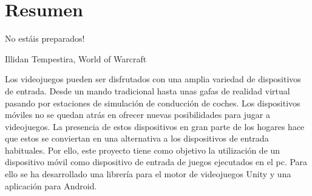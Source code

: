 %
%
%
%
%
%
%
%
%
%
%
%
%


\chapter{Resumen}

\begin{FraseCelebre}
\begin{Frase}
\textexclamdown No est\'ais preparados!
\end{Frase}
\begin{Fuente}
 Illidan Tempestira, World of Warcraft
\end{Fuente}
\end{FraseCelebre}

Los videojuegos pueden ser disfrutados con una amplia variedad de dispositivos de entrada. Desde un mando tradicional hasta unas gafas de realidad virtual pasando por estaciones de simulaci\'on de conducci\'on de coches. Los dispositivos m\'oviles no se quedan atr\'as en ofrecer nuevas posibilidades para jugar a videojuegos. La presencia de estos dispositivos en gran parte de los hogares hace que estos se conviertan en una alternativa a los dispositivos de entrada habituales. Por ello, este proyecto tiene como objetivo la utilizaci\'on de un dispositivo m\'ovil como dispositivo de entrada de juegos ejecutados en el pc. Para ello se ha desarrollado una librer\'ia para el motor de videojuegos Unity y una aplicaci\'on para Android. \\

